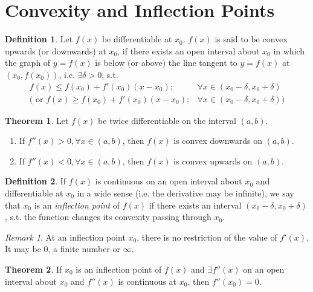 \documentclass[fleqn]{article}
\theoremstyle{definition}
\newtheorem{definition}{Definition}
\theoremstyle{theorem}
\newtheorem{theorem}{Theorem}
\theoremstyle{remark}
\newtheorem{remark}{Remark}
\begin{document}
\section{Convexity and Inflection Points}

\begin{definition}
	Let $f(x)$ be differentiable at $x_0$. $f(x)$ is said to be convex upwards (or downwards) at $x_0$, if there exists an open interval about $x_0$ in which the graph of $y = f(x)$ is below (or above) the line tangent to $y = f(x)$ at $(x_0, f(x_0))$, i.e. 	$\exists \delta > 0$, s.t. 
	\begin{align*}
		f(x) \leq f(x_0) + f'(x_0)(x-x_0) ; &\forall x \in (x_0 - \delta , x_0 + \delta) \\
		\Big( \text{ or } f(x) \geq f(x_0) + f'(x_0)(x-x_0) ; &\forall x \in (x_0 - \delta , x_0 + \delta) \Big)
	\end{align*}
\end{definition}

\begin{theorem}
	Let $f(x)$ be twice differentiable on the interval $(a, b)$.
	\begin{enumerate}
		\item If $f''(x) > 0, \forall x \in (a, b)$, then $f(x)$ is convex downwards on $(a,b)$.
		\item If $f''(x) < 0, \forall x \in (a, b)$, then $f(x)$ is convex upwards on $(a,b)$.
	\end{enumerate}
\end{theorem}

\begin{definition}
	If $f(x)$ is continuous on an open interval about $x_0$ and differentiable at $x_0$ in a wide sense (i.e. the derivative may be infinite), we say that $x_0$ is an \emph{inflection point} of $f(x)$ if there exists an interval $(x_0 - \delta, x_0 + \delta)$, s.t. the function changes its convexity passing through $x_0$.
\end{definition}

\begin{remark}
	At an inflection point $x_0$, there is no restriction of the value of $f'(x)$. It may be $0$, a finite number or $\infty$.
\end{remark}

\begin{theorem}
	If $x_0$ is an inflection point of $f(x)$ and $\exists f''(x)$ on an open interval about $x_0$ and $f''(x)$ is continuous at $x_0$, then $f''(x_0) = 0$.
\end{theorem}
\end{document}
